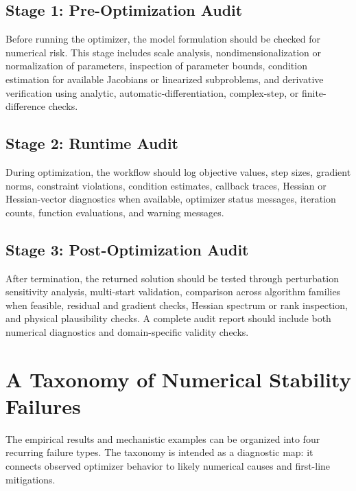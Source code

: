 \subsection{Stage 1: Pre-Optimization Audit}

Before running the optimizer, the model formulation should be checked for numerical risk. This stage includes scale analysis, nondimensionalization or normalization of parameters, inspection of parameter bounds, condition estimation for available Jacobians or linearized subproblems, and derivative verification using analytic, automatic-differentiation, complex-step, or finite-difference checks.

\subsection{Stage 2: Runtime Audit}

During optimization, the workflow should log objective values, step sizes, gradient norms, constraint violations, condition estimates, callback traces, Hessian or Hessian-vector diagnostics when available, optimizer status messages, iteration counts, function evaluations, and warning messages.

\subsection{Stage 3: Post-Optimization Audit}

After termination, the returned solution should be tested through perturbation sensitivity analysis, multi-start validation, comparison across algorithm families when feasible, residual and gradient checks, Hessian spectrum or rank inspection, and physical plausibility checks. A complete audit report should include both numerical diagnostics and domain-specific validity checks.


\section{A Taxonomy of Numerical Stability Failures}

The empirical results and mechanistic examples can be organized into four recurring failure types. The taxonomy is intended as a diagnostic map: it connects observed optimizer behavior to likely numerical causes and first-line mitigations.

